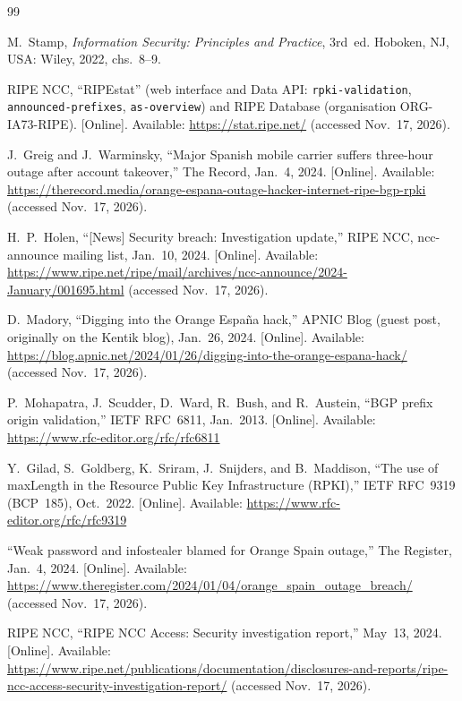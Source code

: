 \documentclass[11pt,a4paper]{article}
\begin{document}
\clearpage
\begin{thebibliography}{99}
\footnotesize\setlength{\itemsep}{1pt}\setlength{\parsep}{0pt}\setlength{\parskip}{0pt}

M.~Stamp, \emph{Information Security: Principles and Practice}, 3rd~ed. Hoboken, NJ, USA: Wiley, 2022, chs.~8--9.

RIPE NCC, ``RIPEstat'' (web interface and Data API: \texttt{rpki-validation}, \texttt{announced-prefixes}, \texttt{as-overview}) and RIPE Database (organisation ORG-IA73-RIPE). [Online]. Available:
\url{https://stat.ripe.net/} (accessed Nov.~17, 2026).

J.~Greig and J.~Warminsky, ``Major Spanish mobile carrier suffers three-hour outage after account takeover,'' The Record, Jan.~4, 2024. [Online]. Available:
\url{https://therecord.media/orange-espana-outage-hacker-internet-ripe-bgp-rpki} (accessed Nov.~17, 2026).

H.~P.~Holen, ``[News] Security breach: Investigation update,'' RIPE NCC, ncc-announce mailing list, Jan.~10, 2024. [Online]. Available:
\url{https://www.ripe.net/ripe/mail/archives/ncc-announce/2024-January/001695.html} (accessed Nov.~17, 2026).

D.~Madory, ``Digging into the Orange Espa\~na hack,'' APNIC Blog (guest post, originally on the Kentik blog), Jan.~26, 2024. [Online]. Available:
\url{https://blog.apnic.net/2024/01/26/digging-into-the-orange-espana-hack/} (accessed Nov.~17, 2026).

P.~Mohapatra, J.~Scudder, D.~Ward, R.~Bush, and R.~Austein, ``BGP prefix origin validation,'' IETF RFC~6811, Jan.~2013. [Online]. Available:
\url{https://www.rfc-editor.org/rfc/rfc6811}

Y.~Gilad, S.~Goldberg, K.~Sriram, J.~Snijders, and B.~Maddison, ``The use of maxLength in the Resource Public Key Infrastructure (RPKI),'' IETF RFC~9319 (BCP~185), Oct.~2022. [Online]. Available:
\url{https://www.rfc-editor.org/rfc/rfc9319}

``Weak password and infostealer blamed for Orange Spain outage,'' The Register, Jan.~4, 2024. [Online]. Available:
\url{https://www.theregister.com/2024/01/04/orange_spain_outage_breach/} (accessed Nov.~17, 2026).

RIPE NCC, ``RIPE NCC Access: Security investigation report,'' May~13, 2024. [Online]. Available:
\url{https://www.ripe.net/publications/documentation/disclosures-and-reports/ripe-ncc-access-security-investigation-report/} (accessed Nov.~17, 2026).


\end{thebibliography}
\end{document}
